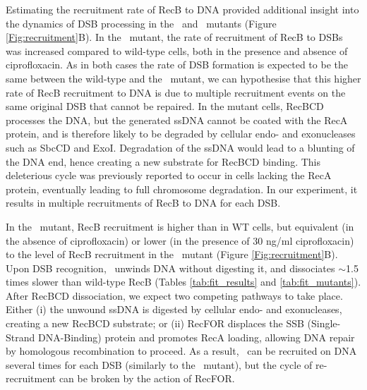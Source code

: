 Estimating the recruitment rate of RecB to DNA provided additional insight into the dynamics of DSB processing in the \dreca\ and \geneteneighty\ mutants (Figure \ref{Fig:recruitment}B). In the \dreca\ mutant, the rate of recruitment of RecB to DSBs was increased compared to wild-type cells, both in the presence and absence of ciprofloxacin. As in both cases the rate of DSB formation is expected to be the same between the wild-type and the \dreca\ mutant, we can hypothesise that this higher rate of RecB recruitment to DNA is due to multiple recruitment events on the same original DSB that cannot be repaired. In the mutant cells, RecBCD processes the DNA, but the generated ssDNA cannot be coated with the RecA protein, and is therefore likely to be degraded by cellular endo- and exonucleases such as SbcCD and ExoI\cite{Zahradka2009}. Degradation of the ssDNA would lead to a blunting of the DNA end, hence creating a new substrate for RecBCD binding. This deleterious cycle was previously reported to occur in cells lacking the RecA protein, eventually leading to full chromosome degradation\cite{Capaldo1975,Skarstad1993}. In our experiment, it results in multiple recruitments of RecB to DNA for each DSB.

In the \geneteneighty\ mutant, RecB recruitment is higher than in WT cells, but equivalent (in the absence of ciprofloxacin) or lower (in the presence of 30 ng/ml ciprofloxacin) to the level of RecB recruitment in the \dreca\ mutant (Figure \ref{Fig:recruitment}B). Upon DSB recognition, \teneighty\ unwinds DNA without digesting it, and dissociates $\sim$1.5 times slower than wild-type RecB (Tables \ref{tab:fit_results} and \ref{tab:fit_mutants}). After RecBCD dissociation, we expect two competing pathways to take place. Either (i) the unwound ssDNA is digested by cellular endo- and exonucleases, creating a new RecBCD substrate; or (ii) RecFOR displaces the SSB (Single-Strand DNA-Binding) protein and promotes RecA loading, allowing DNA repair by homologous recombination to proceed\cite{Ivancic-Bace_2003}. As a result, \teneighty\ can be recruited on DNA several times for each DSB (similarly to the \dreca\ mutant), but the cycle of re-recruitment can be broken by the action of RecFOR.

